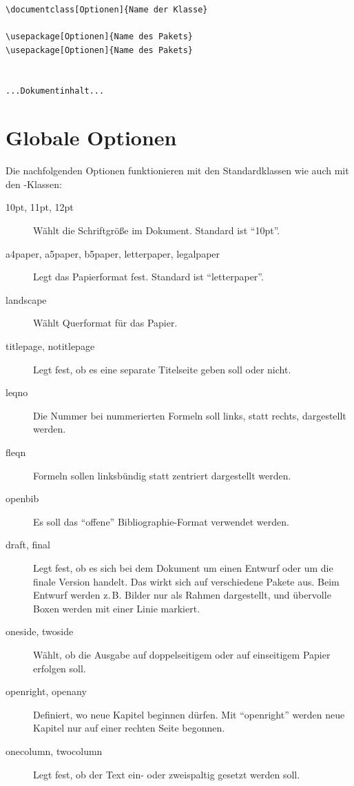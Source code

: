 \begin{lstlisting}
\documentclass[Optionen]{Name der Klasse}

\usepackage[Optionen]{Name des Pakets}
\usepackage[Optionen]{Name des Pakets}


...Dokumentinhalt...

\end{lstlisting}

\section{Globale Optionen}
\label{sec:globaleoptionen}

Die nachfolgenden Optionen funktionieren mit den Standardklassen wie auch mit den \KOMAScript-Klassen:

\begin{description}
	\item[10pt, 11pt, 12pt] Wählt die Schriftgröße im Dokument. Standard ist \enquote{10pt}.
	\item[a4paper, a5paper, b5paper, letterpaper, legalpaper]
		Legt das Papier\-format fest. Standard ist \enquote{letterpaper}.
	\item[landscape] Wählt Querformat für das Papier.
	\item[titlepage, notitlepage] Legt fest, ob es eine separate Titelseite
		geben soll oder nicht.
	\item[leqno] Die Nummer bei nummerierten Formeln soll links, statt rechts,
		dargestellt werden.
	\item[fleqn] Formeln sollen linksbündig statt zentriert dargestellt werden.
	\item[openbib] Es soll das \enquote{offene} Bibliographie-Format verwendet werden.
	\item[draft, final] Legt fest, ob es sich bei dem Dokument um einen Entwurf
	  oder um die finale Version handelt. Das wirkt sich auf verschiedene Pakete
	  aus. Beim Entwurf werden z.\,B. Bilder nur als Rahmen dargestellt, und
	  übervolle Boxen werden mit einer Linie markiert.
	\item[oneside, twoside] Wählt, ob die Ausgabe auf doppelseitigem oder auf 
	  einseitigem Papier erfolgen soll.
	\item[openright, openany] Definiert, wo neue Kapitel beginnen dürfen. Mit
		\enquote{openright} werden neue Kapitel nur auf einer rechten Seite begonnen.
	\item[onecolumn, twocolumn] Legt fest, ob der Text ein- oder zweispaltig
		gesetzt werden soll.
\end{description}

